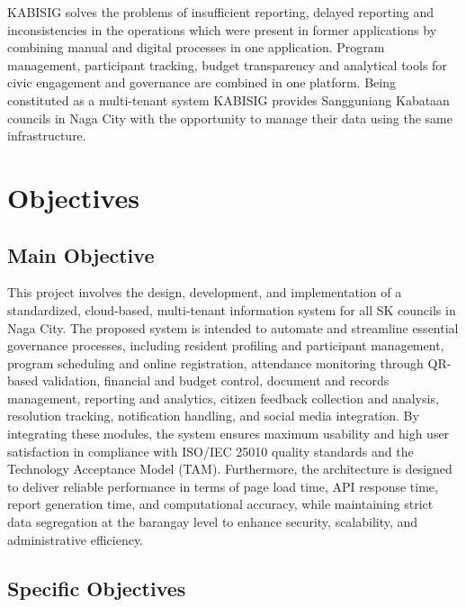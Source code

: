 \vspace{3mm}
\hspace*{\parindent}KABISIG solves the problems of insufficient reporting, delayed reporting and inconsistencies in the operations which were present in former applications by combining manual and digital processes in one application. Program management, participant tracking, budget transparency and analytical tools for civic engagement and governance are combined in one platform. Being constituted as a multi-tenant system KABISIG provides Sangguniang Kabataan councils in Naga City with the opportunity to manage their data using the same infrastructure.
\vspace{5mm}

\section{Objectives}
\label{sec:objectives}

\subsection{Main Objective}
\label{subsec:main_objective}

\hspace*{\parindent}This project involves the design, development, and implementation of a standardized, cloud-based, multi-tenant information system for all SK councils in Naga City. The proposed system is intended to automate and streamline essential governance processes, including resident profiling and participant management, program scheduling and online registration, attendance monitoring through QR-based validation, financial and budget control, document and records management, reporting and analytics, citizen feedback collection and analysis, resolution tracking, notification handling, and social media integration. By integrating these modules, the system ensures maximum usability and high user satisfaction in compliance with ISO/IEC 25010 quality standards and the Technology Acceptance Model (TAM). Furthermore, the architecture is designed to deliver reliable performance in terms of page load time, API response time, report generation time, and computational accuracy, while maintaining strict data segregation at the barangay level to enhance security, scalability, and administrative efficiency.
\vspace{3mm}

\subsection{Specific Objectives}
\label{subsec:specific_objectives}

